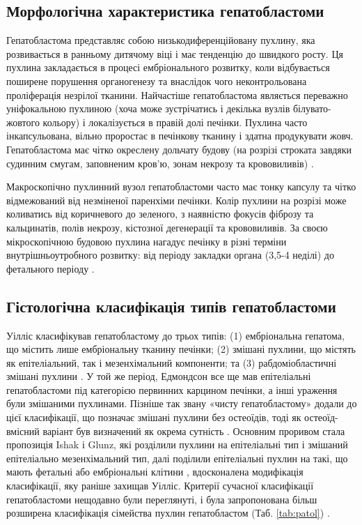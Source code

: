 \subsection{Морфологічна характеристика гепатобластоми}
  
Гепатобластома представляє собою низькодиференційовану пухлину, яка розвивається в ранньому дитячому віці і має тенденцію до швидкого росту. Ця пухлина закладається в процесі ембріонального розвитку, коли відбувається поширене порушення органогенезу та внаслідок чого неконтрольована проліферація незрілої тканини. Найчастіше гепатобластома являється переважно уніфокальною пухлиною (хоча може зустрічатись і декілька вузлів білувато-жовтого кольору) і локалізується  в правій долі печінки. Пухлина часто інкапсульована, вільно проростає в печінкову тканину і здатна продукувати жовч. Гепатобластома має  чітко окреслену дольчату будову (на розрізі строката завдяки  судинним смугам, заповненим кров’ю, зонам некрозу та крововиливів) \cite{pmid32421442}.

Макроскопічно пухлинний вузол гепатобластоми часто має тонку капсулу та чітко відмежований від незміненої  паренхіми печінки. Колір пухлини на розрізі може коливатись від коричневого до зеленого, з наявністю фокусів фіброзу та кальцинатів, полів некрозу, кістозної дегенерації та крововиливів. 
За своєю мікроскопічною будовою пухлина нагадує печінку в різні терміни  внутрішньоутробного розвитку: від періоду закладки органа (3,5-4 неділі) до фетального періоду \cite{pmid20070564}.

\subsection{Гістологічна класифікація типів гепатобластоми}
 Уілліс класифікував гепатобластому до трьох типів: (1) ембріональна гепатома, що містить лише ембріональну тканину печінки; (2) змішані пухлини, що містять як епітеліальний, так і мезенхімальний компоненти; та (3) рабдоміобластичні змішані пухлини  \cite{pmid24852330}. У той же період, Едмондсон все ще мав епітеліальні гепатобластоми під категорією первинних карцином печінки, а інші ураження були змішаними пухлинами. Пізніше так звану «чисту гепатобластому» додали до цієї класифікації, що позначає змішані пухлини без остеоїдів, тоді як остеоїд-вмісний варіант був визначений як окрема сутність \cite{pmid32421442}. Основним проривом стала пропозиція Ishak і Glunz, які розділили пухлини на епітеліальні тип і змішаний епітеліально мезенхімальний тип, далі поділили епітеліальні пухлин на такі, що мають фетальні або ембріональні клітини \cite{pmid20070564}, вдосконалена модифікація класифікації, яку раніше захищав Уілліс. Критерії сучасної класифікації гепатобластоми нещодавно були переглянуті, і була запропонована більш розширена класифікація сімейства пухлин гепатобластом (Таб. \ref{tab:patol}) \cite{pmid24759227}. 



